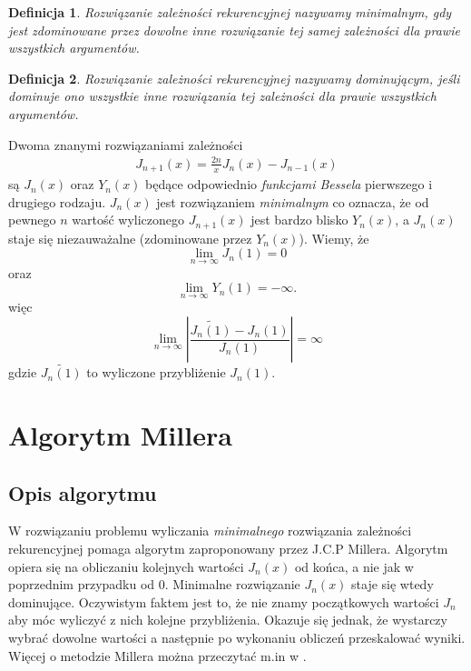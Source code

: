 \documentclass{article}
\newtheorem{de}{Definicja}
\begin{document}
\begin{de}
Rozwiązanie zależności rekurencyjnej nazywamy \textit{minimalnym}, gdy jest zdominowane przez dowolne inne rozwiązanie tej samej zależności dla prawie wszystkich argumentów.
\end{de}

\begin{de}
Rozwiązanie zależności rekurencyjnej nazywamy \textit{dominującym}, jeśli dominuje ono wszystkie inne rozwiązania tej zależności dla prawie wszystkich argumentów.
\end{de}
Dwoma znanymi rozwiązaniami zależności 
\begin{align} 
J_{n+ 1}(x) = \frac{2n}{x}J_n(x) - J_{n - 1}(x) \tag*{(n = 1, 2,..).}
\end{align}
są $J_n(x)$ oraz $Y_n(x)$ będące odpowiednio \textit{funkcjami Bessela} pierwszego i drugiego rodzaju. $J_n(x)$ jest rozwiązaniem \textit{minimalnym} co oznacza, że od pewnego $n$ wartość wyliczonego $J_{n + 1}(x)$ jest bardzo blisko $Y_n(x)$, a $J_n(x)$ staje się niezauważalne (zdominowane przez $Y_n(x)$). Wiemy, że
\begin{equation}
\lim_{n \to \infty} J_n(1) = 0
\end{equation}
oraz
\begin{equation}
\lim_{n \to \infty} Y_n(1) = -\infty.
\end{equation}
więc
\begin{equation}
\lim_{n \to \infty}|\frac{\widetilde{J_n(1)} - J_n(1)}{J_n(1)}| = \infty
\end{equation}
gdzie $\widetilde{J_n(1)}$ to wyliczone przybliżenie $J_n(1)$.

\section{Algorytm Millera}

\subsection{Opis algorytmu}
W rozwiązaniu problemu wyliczania \textit{minimalnego} rozwiązania zależności rekurencyjnej pomaga algorytm zaproponowany przez J.C.P Millera. Algorytm opiera się na obliczaniu kolejnych wartości $J_n(x)$ od końca, a nie jak w poprzednim przypadku od $0$. Minimalne rozwiązanie $J_n(x)$ staje się wtedy dominujące. Oczywistym faktem jest to, że nie znamy początkowych wartości $J_n$ aby móc wyliczyć z nich kolejne przybliżenia. Okazuje się jednak, że wystarczy wybrać dowolne wartości a następnie po wykonaniu obliczeń przeskalować wyniki. Więcej o metodzie Millera można przeczytać m.in w \cite{GA}.
\end{document}
